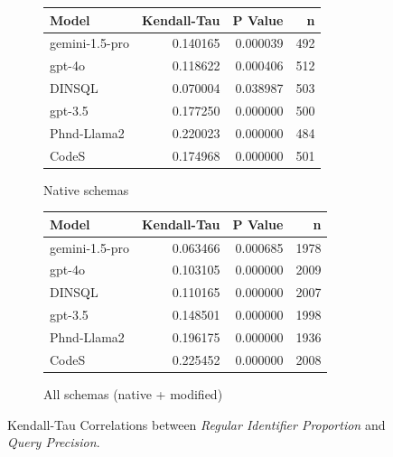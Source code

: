 \begin{figure}
  \centering
  \begin{subfigure}{.5\linewidth}
      \centering
      \begin{tabular}{lrrr}
\toprule
Model & Kendall-Tau & P Value & n \\
\midrule
gemini-1.5-pro & 0.140165 & 0.000039 & 492 \\
gpt-4o & 0.118622 & 0.000406 & 512 \\
DINSQL & 0.070004 & 0.038987 & 503 \\
gpt-3.5 & 0.177250 & 0.000000 & 500 \\
Phnd-Llama2 & 0.220023 & 0.000000 & 484 \\
CodeS & 0.174968 & 0.000000 & 501 \\
\bottomrule
\end{tabular}

      \caption{Native schemas}
      \label{table:nathigh-precision-ktau-native}
  \end{subfigure}%
  \begin{subfigure}{.5\linewidth}
      \centering
      \begin{tabular}{lrrr}
\toprule
Model & Kendall-Tau & P Value & n \\
\midrule
gemini-1.5-pro & 0.063466 & 0.000685 & 1978 \\
gpt-4o & 0.103105 & 0.000000 & 2009 \\
DINSQL & 0.110165 & 0.000000 & 2007 \\
gpt-3.5 & 0.148501 & 0.000000 & 1998 \\
Phnd-Llama2 & 0.196175 & 0.000000 & 1936 \\
CodeS & 0.225452 & 0.000000 & 2008 \\
\bottomrule
\end{tabular}

      \caption{All schemas (native + modified)}
      \label{table:nathigh-precision-ktau-all}
  \end{subfigure}
  \caption{Kendall-Tau Correlations between \emph{Regular Identifier Proportion} and \emph{Query Precision}.}
\end{figure}


